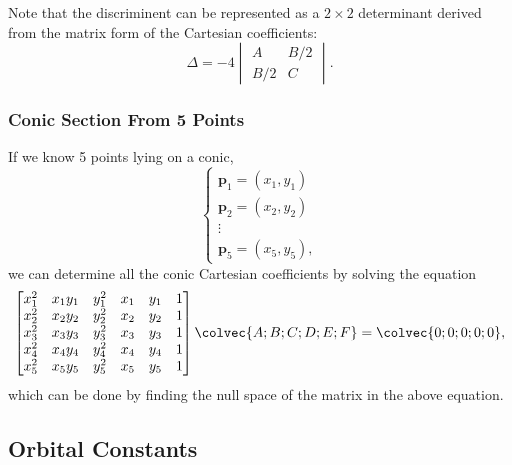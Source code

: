 Note that the discriminent can be represented as a $2\times2$ determinant derived from the matrix form of the Cartesian coefficients:
\begin{equation}
  \Delta = -4\begin{vmatrix} A & B/2 \\ B/2 & C \end{vmatrix}.
  \label{eq:conic_section_discriminant_as_determinant}
\end{equation}

\subsubsection{Conic Section From 5 Points}
If we know 5 points lying on a conic,
\begin{equation}
  \begin{cases}
    \bm{p}_{1}=\left(x_{1},y_{1}\right)\\
    \bm{p}_{2}=\left(x_{2},y_{2}\right)\\
    \vdots\\
    \bm{p}_{5}=\left(x_{5},y_{5}\right),
  \end{cases}
  \label{eq:5_points_on_conic}
\end{equation}
we can determine all the conic Cartesian coefficients by solving the equation
\begin{equation}
  \begin{bmatrix}
    x_{1}^{2} & x_{1}y_{1} & y_{1}^{2} & x_{1} & y_{1} & 1\\
    x_{2}^{2} & x_{2}y_{2} & y_{2}^{2} & x_{2} & y_{2} & 1\\
    x_{3}^{2} & x_{3}y_{3} & y_{3}^{2} & x_{3} & y_{3} & 1\\
    x_{4}^{2} & x_{4}y_{4} & y_{4}^{2} & x_{4} & y_{4} & 1\\
    x_{5}^{2} & x_{5}y_{5} & y_{5}^{2} & x_{5} & y_{5} & 1
  \end{bmatrix}
  \colvec{A;B;C;D;E;F} = \colvec{0;0;0;0;0},
  \label{eq:5_points_determine_conic_matrix_equation}
\end{equation}
which can be done by finding the null space of the matrix in the above equation.


\subsection{Orbital Constants}
